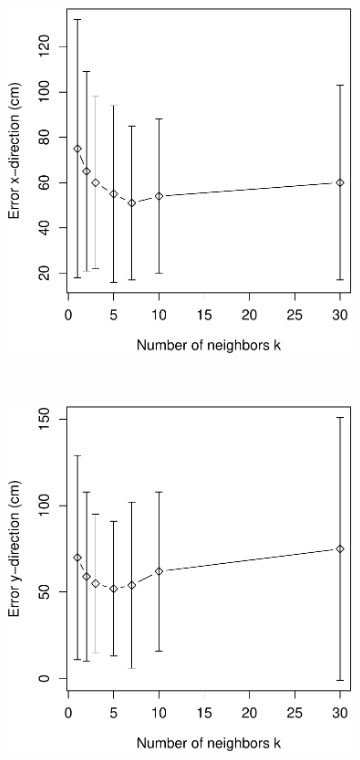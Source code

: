 \documentclass[11pt]{report}
\begin{document}
\begin{figure}[H]
  \centering
  \begin{subfigure}[b]{0.47\textwidth}
  \includegraphics[width=1\textwidth]{k_x-crop}
  \end{subfigure}%
~
  \begin{subfigure}[b]{0.47\textwidth}
  \includegraphics[width=1\textwidth]{k_y-crop}

\end{subfigure}
\end{figure}
\end{document}
